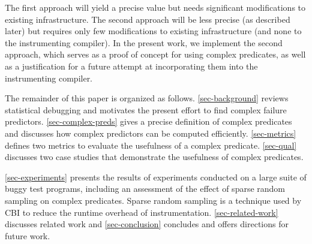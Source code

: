 The first approach will yield a precise value but needs significant modifications to existing infrastructure.  The second approach will be less precise (as described later) but requires only few modifications to existing infrastructure (and none to the instrumenting compiler).  In the present work, we implement the second approach, which serves as a proof of concept for using complex predicates, as well as a justification for a future attempt at incorporating them into the instrumenting compiler.

The remainder of this paper is organized as follows.  \autoref{sec-background} reviews statistical debugging and motivates the present effort to find complex failure predictors.  \autoref{sec-complex-preds} gives a precise definition of complex predicates and discusses how complex predictors can be computed efficiently.  \autoref{sec-metrics} defines two metrics to evaluate the usefulness of a complex predicate.  \autoref{sec-qual} discusses two case studies that demonstrate the usefulness of complex predicates.

\autoref{sec-experiments} presents the results of experiments conducted on a large suite of buggy test programs, including an assessment of the effect of sparse random sampling on complex predicates.  Sparse random sampling is a technique used by CBI to reduce the runtime overhead of instrumentation.  \autoref{sec-related-work} discusses related work and \autoref{sec-conclusion} concludes and offers directions for future work.

